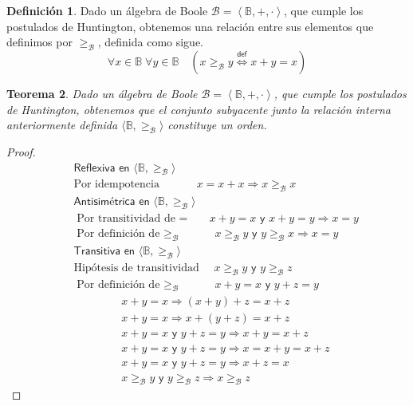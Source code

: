 \documentclass[final,12pt,a4paper,twoside,fleqn]{extbook}
\newcommand{\sthen}{\ensuremath{\Longrightarrow}}
\newcommand{\logicdef}{\ensuremath{
        \stackrel
            {\mathsf{def}}
            {\Longleftrightarrow}
}}
\newcommand{\then}{\ensuremath{\sthen}}
\newcommand{\setB}{\ensuremath{\mathbb{B}}}
\newcommand{\algB}{\ensuremath{\mathscr{B}}}
\newcommand{\geqB}{\ensuremath{{\geq}_{\algB}}}
\newtheorem{thm}{Teorema}[chapter]
\theoremstyle{definition}
\newtheorem{defn}[thm]{Definición}
\theoremstyle{remark}
\begin{document}
\begin{defn}
Dado un álgebra de Boole \(\algB = \left\langle \setB, +, \cdot
\right\rangle\), que cumple los postulados de Huntington, obtenemos una
relación entre sus elementos que definimos por \( \geqB \), definida
como sigue.
\begin{equation}
\forall x \in \setB \; \forall y \in \setB \quad \left( x \geqB y \logicdef x
+ y = x \right)
\end{equation}
\end{defn}



\begin{thm}
Dado un álgebra de Boole \(\algB = \left\langle \setB, +, \cdot
\right\rangle\), que cumple los postulados de Huntington, obtenemos que el
conjunto subyacente junto la relación interna anteriormente definida
\(\langle \setB , \geqB \rangle\) constituye un orden.
\end{thm}



\begin{proof}
\begin{eqnarray}
\nonumber
&&\textsf{Reflexiva en \(\langle\setB,\geqB\rangle\)  }\\
&&\text{Por idempotencia }\qquad\quad x = x + x \then x \geqB x\\
&&\textsf{Antisimétrica en \(\langle\setB,\geqB\rangle\)  }\\
&&\text{Por transitividad  de \(=\) } \quad x + y = x \textsf{ y } x + y = y
\then x = y\\
&&\text{Por definición de \(\geqB\) } \;\qquad x \geqB y
\textsf{ y } y \geqB x \then x = y\\
&&\textsf{Transitiva en \(\langle\setB,\geqB\rangle\)  }\\
&&\text{Hipótesis de transitividad } \quad x \geqB y \textsf{ y } y
\geqB z\\
&&\text{Por definición de \(\geqB\) } \;\qquad x + y = x \textsf{ y }
y + z = y\\
&&\qquad\;\qquad x + y = x \then (x + y) + z = x + z\\
&&\qquad\;\qquad x + y = x \then x + (y + z) = x + z\\
&&\qquad\;\qquad x + y = x \textsf{ y } y + z = y \then x + y = x + z\\
&&\qquad\;\qquad x + y = x \textsf{ y } y + z = y \then x = x + y = x + z\\
&&\qquad\;\qquad x + y = x \textsf{ y } y + z = y \then x + z = x\\
&&\qquad\;\qquad x \geqB y \textsf{ y } y \geqB z \then x
\geqB z
\end{eqnarray}
\end{proof}
\end{document}
